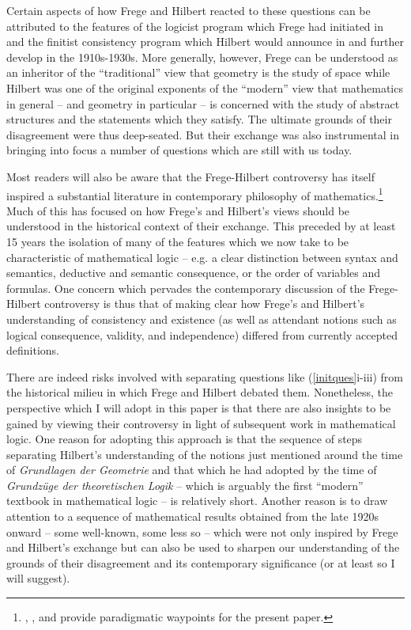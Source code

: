 \documentclass[11pt,fleqn,leqno]{article}
\begin{document}
Certain aspects of how Frege and Hilbert reacted to these questions can be attributed to the features of the logicist program which Frege had initiated in \citeyearpar{Frege1884} and the finitist consistency program which Hilbert would announce in \citeyearpar{Hilbert1904} and further develop in the 1910s-1930s.   More generally, however, Frege can be understood as an inheritor of the ``traditional'' view that geometry is the study of space while Hilbert was one of the original exponents of the ``modern'' view that mathematics in general -- and geometry in particular -- is concerned with the study of abstract structures and the statements which they satisfy.  The ultimate grounds of their disagreement were thus deep-seated.   But their exchange was also instrumental in bringing into focus a number of questions which are still with us today.  

Most readers will also be aware that the Frege-Hilbert controversy has itself inspired a substantial literature in contemporary philosophy of mathematics.\footnote{\citep{Resnik1974a}, \citep{Hallett1990,Hallett2010}, and \citep{Blanchette1996,Blanchette2012} provide paradigmatic waypoints for the present paper.}  Much of this has focused on how Frege's and Hilbert's views should be understood in the historical context of their exchange.  This preceded by at least 15 years the isolation of many of the features which we now take to be characteristic of mathematical logic -- e.g. a clear distinction between syntax and semantics, deductive and semantic consequence, or the order of variables and formulas.  One concern which pervades the contemporary discussion of the Frege-Hilbert controversy is thus that of making clear how Frege's and Hilbert's understanding of  consistency and existence (as well as attendant  notions such as logical consequence, validity, and independence) differed from currently accepted definitions.

There are indeed risks involved with separating questions like (\ref{initques}i-iii) from the historical milieu in which Frege and Hilbert debated them.   Nonetheless, the perspective which I will adopt in this paper is that there are also insights to be gained by viewing their controversy in light of subsequent work in mathematical logic.   One reason for adopting this approach is that the sequence of steps separating Hilbert's understanding of the notions just mentioned around the time of \textsl{Grundlagen der Geometrie} and that which he had adopted by the time of  \textsl{Grundz\"uge der theoretischen Logik} \citeyearpar{Hilbert1928} -- which is arguably the first ``modern'' textbook in mathematical logic -- is relatively short.   Another reason is to draw attention to a sequence of mathematical results obtained from the late 1920s onward -- some well-known, some less so -- which were not only inspired by Frege and Hilbert's exchange but can also be used to sharpen our understanding of the grounds of their disagreement and its contemporary significance (or at least so I will suggest).   
\end{document}
